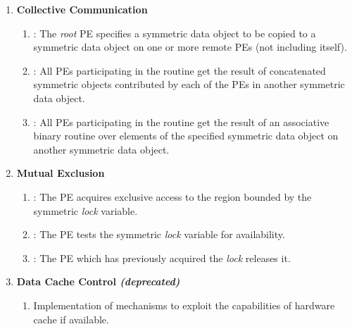 \begin{enumerate}
\item \textbf{Collective Communication}
\begin{enumerate}
  \item {}:  The \textit{root} \ac{PE} specifies a symmetric data
      object to be copied to a symmetric data object on one or more remote
      \acp{PE} (not including itself). 
  \item {}:  All \acp{PE} participating in the routine get the result
      of concatenated symmetric objects contributed by each of the \acp{PE} in
      another symmetric data object.
  \item {}:  All \acp{PE} participating in the routine get the result
      of an associative binary routine over elements of the specified symmetric
      data object on another symmetric data object. 
\end{enumerate}

\item \textbf{Mutual Exclusion}
\begin{enumerate}
  \item {}: The \ac{PE} acquires exclusive access to the region
      bounded by the symmetric \textit{lock} variable.
  \item {}: The \ac{PE} tests the symmetric \textit{lock} variable
      for availability.
  \item {}: The \ac{PE} which has previously acquired the
      \textit{lock} releases it.
\end{enumerate}

\item \textbf{Data Cache Control \textit{(deprecated)}}
\begin{enumerate}
  \item Implementation of mechanisms to exploit the capabilities of hardware cache
      if available.
\end{enumerate}
\end{enumerate}
